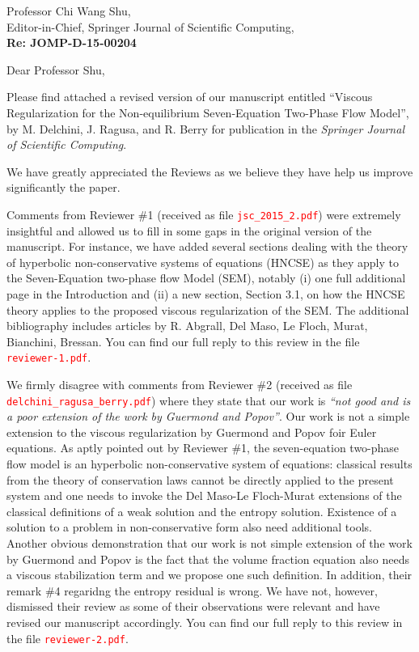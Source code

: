 \documentclass[11pt]{letter}
\newcommand{\tcr}[1]{\textcolor{red}{#1}}
\begin{document}
\begin{letter}{Professor Chi Wang Shu, \\  Editor-in-Chief, Springer Journal of Scientific Computing,\\
\textbf{Re: JOMP-D-15-00204}}


\date{\today}

\opening{Dear Professor Shu,}
         \vspace{0.25cm}

Please find attached  a revised version of our manuscript entitled
``Viscous Regularization for the Non-equilibrium Seven-Equation Two-Phase Flow Model'',
by M. Delchini, J. Ragusa, and R. Berry for publication in the {\it  Springer Journal of Scientific Computing}. 

We have greatly appreciated the Reviews as we believe they have help us improve significantly the paper. 

Comments from Reviewer \#1 (received as file \tcr{{\tt jsc\_2015\_2.pdf}}) were extremely insightful and allowed
us to fill in some gaps in the original version of the manuscript. For instance, we have added several sections
dealing with the theory of hyperbolic non-conservative systems of equations (HNCSE) as they apply to the 
Seven-Equation two-phase flow Model (SEM), notably (i) one full additional page in the Introduction and 
(ii) a new section, Section 3.1, on how the HNCSE theory applies to the proposed viscous regularization of the SEM.
The additional bibliography includes articles by R. Abgrall, Del Maso, Le Floch, Murat, Bianchini, Bressan. You can find 
our full reply to this review in the file \tcr{{\tt reviewer-1.pdf}}.


We firmly disagree with comments from Reviewer \#2 (received as file \tcr{{\tt delchini\_ragusa\_berry.pdf}})
where they state that our work is {\it ``not good and is a poor extension of the work by Guermond and Popov''}.
Our work is not a simple extension to the viscous regularization by Guermond and Popov foir Euler equations. 
As aptly pointed out by Reviewer \#1, the seven-equation two-phase flow model is an hyperbolic non-conservative 
system of equations: classical results from the theory of conservation laws cannot be directly
applied to the present system and one needs to invoke the Del Maso-Le Floch-Murat extensions of the 
classical definitions of a weak solution and the entropy solution. Existence of a solution to
a problem in non-conservative form also need additional tools. Another obvious demonstration that our
work is not simple extension of the work by Guermond and Popov is the fact that the volume fraction equation
also needs a  viscous stabilization term and we propose one such definition. 
In addition, their remark \#4 regaridng the entropy residual is wrong. 
We have not, however, dismissed their review as some of their observations were relevant and have revised
our manuscript accordingly. You can find our full reply to this review in the file \tcr{{\tt reviewer-2.pdf}}.


\end{letter}
\end{document}
